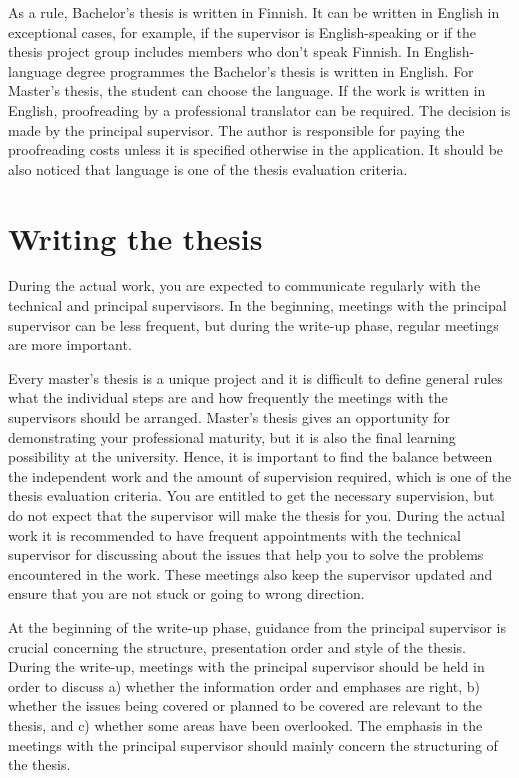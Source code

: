 As a rule, Bachelor's thesis is written in Finnish. It can be written in English in exceptional cases, for example, if the supervisor is English-speaking or if the thesis project group includes members who don't speak Finnish. In English-language degree programmes the Bachelor's thesis is written in English. For Master's thesis, the student can choose the language. If the work is written in English, proofreading by a professional translator can be required. The decision is made by the principal supervisor. The author is responsible for paying the proofreading costs unless it is specified otherwise in the application. It should be also noticed that language is one of the thesis evaluation criteria.

\section{Writing the thesis}
\label{writing}

During the actual work, you are expected to communicate regularly with the technical and principal supervisors. In the beginning, meetings with the principal supervisor can be less frequent, but during the write-up phase, regular meetings are more important.

Every master’s thesis is a unique project and it is difficult to define general rules what the individual steps are and how frequently the meetings with the supervisors should be arranged. Master’s thesis gives an opportunity for demonstrating your professional maturity, but it is also the final learning possibility at the university. Hence, it is important to find the balance between the independent work and the amount of supervision required, which is one of the thesis evaluation criteria. You are entitled to get the necessary supervision, but do not expect that the supervisor will make the thesis for you. During the actual work it is recommended to have frequent appointments with the technical supervisor for discussing about the issues that help you to solve the problems encountered in the work. These meetings also keep the supervisor updated and ensure that you are not stuck or going to wrong direction.

At the beginning of the write-up phase, guidance from the principal supervisor is crucial concerning the structure, presentation order and style of the thesis. During the write-up, meetings with the principal supervisor should be held in order to discuss a) whether the information order and emphases are right, b) whether the issues being covered or planned to be covered are relevant to the thesis, and c) whether some areas have been overlooked. The emphasis in the meetings with the principal supervisor should mainly concern the structuring of the thesis.

